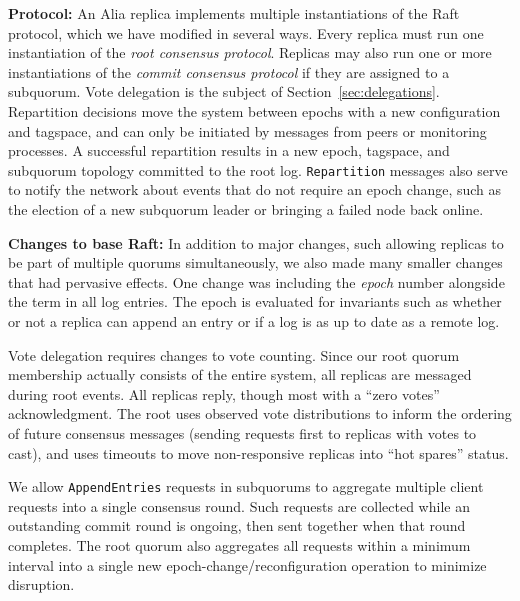 \documentclass[letterpaper,10pt,twocolumn]{article}
\newcommand{\sub}{subquorum\xspace}
\newcommand{\subs}{subquorums\xspace}
\newcommand{\sys}{Alia\xspace}
\newcommand{\roo}{root quorum\xspace}
\newcommand{\para}[1]{\vspace{.04in}\noindent\textbf{#1}}
\begin{document}
\para{Protocol:} An \sys replica implements multiple instantiations of the
Raft protocol, which we have modified in several ways.
% 
Every replica must run one instantiation of the \textit{root consensus
protocol}.
Replicas may also run one or more instantiations of the \textit{commit
consensus protocol} if they are assigned to a \sub.
Vote delegation is the subject of Section~\ref{sec:delegations}.
Repartition decisions move the system between
epochs with a new configuration and tagspace, and can only be initiated by
messages from peers or monitoring processes.
A successful repartition results in a new epoch, tagspace, and \sub topology
committed to the root log.
\texttt{Repartition} messages also serve to notify the network about events
that do not require an epoch change, such as the election of a new \sub leader
or bringing a failed node back online.

\para{Changes to base Raft:} In addition to major changes, such allowing
replicas to be part of multiple quorums simultaneously, we also made many
smaller changes that had pervasive effects.
One change was including the \textit{epoch} number alongside the term in all
log entries.
The epoch is evaluated for invariants such as whether or not a replica can
append an entry or if a log is as up to date as a remote log.

Vote delegation requires changes to vote counting.
Since our \roo membership actually consists of the entire system, all replicas
are messaged during root events.
All replicas reply, though most with a ``zero votes'' acknowledgment.
The root uses observed vote distributions to inform the ordering of future
consensus messages (sending requests first to replicas with votes to cast),
and uses timeouts to move non-responsive replicas into ``hot spares'' status.

We allow \texttt{AppendEntries} requests in \subs to aggregate multiple client
requests into a single consensus round.
Such requests are collected while an outstanding commit round is ongoing, then
sent together when that round completes.
The \roo also aggregates all requests within a minimum interval into a single
new epoch-change/reconfiguration operation to minimize disruption.
\end{document}
